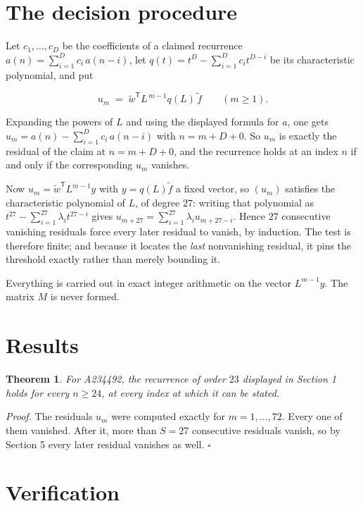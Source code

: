 \documentclass[11pt]{article}
\newtheorem{theorem}{Theorem}
\theoremstyle{definition}
\begin{document}
\section{The decision procedure}

Let $c_1,\dots,c_D$ be the coefficients of a claimed recurrence $a(n) = \sum_{i=1}^{D} c_i\,a(n-i)$, let $q(t) = t^{D} - \sum_{i=1}^{D} c_i t^{D-i}$ be its characteristic polynomial, and put

\[u_m \;=\; \tilde w^{\mathsf T} L^{\,m-1} q(L)\,\tilde f \qquad (m \ge 1).\]

Expanding the powers of $L$ and using the displayed formula for $a$, one gets $u_m = a(n) - \sum_{i=1}^{D} c_i\,a(n-i)$ with $n = m + D + 0$. So $u_m$ is exactly the residual of the claim at $n = m + D + 0$, and the recurrence holds at an index $n$ if and only if the corresponding $u_m$ vanishes.

Now $u_m = \tilde w^{\mathsf T} L^{m-1} y$ with $y = q(L)\tilde f$ a fixed vector, so $(u_m)$ satisfies the characteristic polynomial of $L$, of degree $27$: writing that polynomial as $t^{27} - \sum_{i=1}^{27} \lambda_i t^{27-i}$ gives $u_{m+27} = \sum_{i=1}^{27} \lambda_i u_{m+27-i}$. Hence $27$ consecutive vanishing residuals force every later residual to vanish, by induction. The test is therefore finite; and because it locates the {\itshape last} nonvanishing residual, it pins the threshold exactly rather than merely bounding it.

Everything is carried out in exact integer arithmetic on the vector $L^{m-1}y$. The matrix $M$ is never formed.

\section{Results}

\begin{theorem} For A234492, the recurrence of order $23$ displayed in Section 1 holds for every $n \ge 24$, at every index at which it can be stated.\end{theorem}

{\itshape Proof.} The residuals $u_m$ were computed exactly for $m = 1,\dots,72$. Every one of them vanished. After it, more than $S = 27$ consecutive residuals vanish, so by Section 5 every later residual vanishes as well. $\square$

\section{Verification}
\end{document}
